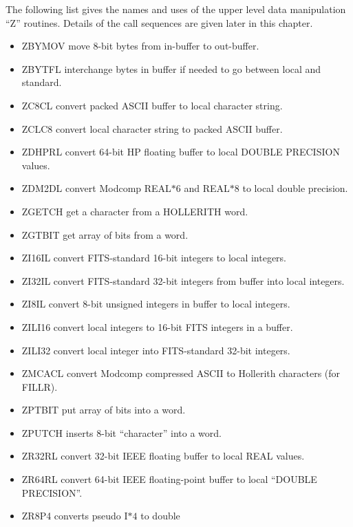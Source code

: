 The following list gives the names and uses of the upper level data
manipulation ``Z'' routines.  Details of the call sequences are given
later in this chapter.
\begin{itemize} %
\item ZBYMOV    move 8-bit bytes from in-buffer to
out-buffer.
\item ZBYTFL    interchange bytes in buffer if needed to
go between local and standard.
\item ZC8CL     convert packed ASCII buffer to local
character string.
\item ZCLC8     convert local character string to packed
ASCII buffer.
\item ZDHPRL    convert 64-bit HP floating buffer to
local DOUBLE PRECISION values.
\item ZDM2DL    convert Modcomp REAL$\ast 6$ and
REAL$\ast 8$ to local double precision.
\item ZGETCH    get a character from a HOLLERITH word.
\item ZGTBIT    get array of bits from a word.
\item ZI16IL    convert FITS-standard 16-bit integers to
local integers.
\item ZI32IL    convert FITS-standard 32-bit integers
from buffer into local integers.
\item ZI8IL     convert 8-bit unsigned integers in buffer
to local integers.
\item ZILI16    convert local integers to 16-bit FITS
integers in a buffer.
\item ZILI32    convert local integer into FITS-standard
32-bit integers.
\item ZMCACL    convert Modcomp compressed ASCII to
Hollerith characters (for FILLR).
\item ZPTBIT    put array of bits into a word.
\item ZPUTCH    inserts 8-bit ``character'' into a word.
\item ZR32RL    convert 32-bit IEEE floating buffer to
local REAL values.
\item ZR64RL    convert 64-bit IEEE floating-point
buffer to local ``DOUBLE PRECISION''.
\item ZR8P4     converts pseudo I$\ast 4$ to double

\end{itemize}

